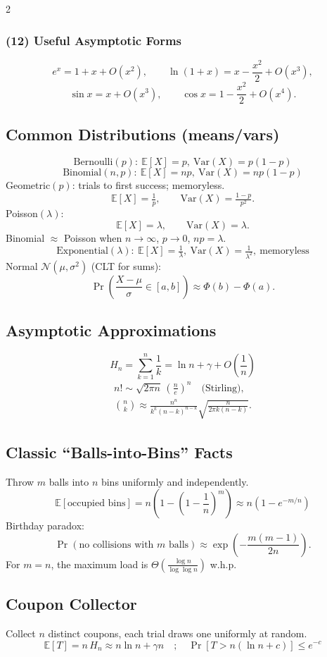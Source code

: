 \documentclass[8pt]{extarticle}
\theoremstyle{definition}
\begin{document}
\begin{multicols*}{2}
\subsubsection*{(12) Useful Asymptotic Forms}
\[
e^x = 1 + x + O(x^2), \qquad
\ln(1+x) = x - \frac{x^2}{2} + O(x^3),
\]
\[
\sin x = x + O(x^3), \qquad
\cos x = 1 - \frac{x^2}{2} + O(x^4).
\]

\subsection{Common Distributions (means/vars)}
\[
\text{Bernoulli}(p):\ \mathbb{E}[X]=p,\ \mathrm{Var}(X)=p(1-p)
\]
\[
\text{Binomial}(n,p):\ \mathbb{E}[X]=np,\ \mathrm{Var}(X)=np(1-p)
\]
Geometric$(p)$: trials to first success; memoryless.
\[
\mathbb{E}[X]=\tfrac{1}{p},\qquad \mathrm{Var}(X)=\tfrac{1-p}{p^2}.
\]
Poisson$(\lambda)$:
\[
\mathbb{E}[X]=\lambda,\qquad \mathrm{Var}(X)=\lambda.
\]
Binomial $\approx$ Poisson when $n\to\infty$, $p\to0$, $np=\lambda$.
\[
\text{Exponential}(\lambda):\ \mathbb{E}[X]=\tfrac{1}{\lambda},\ \mathrm{Var}(X)=\tfrac{1}{\lambda^2},\ \text{memoryless}
\]
Normal $\mathcal{N}(\mu,\sigma^2)$ (CLT for sums):
\[
\Pr\left(\frac{X-\mu}{\sigma}\in[a,b]\right)\approx \Phi(b)-\Phi(a).
\]

\subsection{Asymptotic Approximations}
\[
H_n=\sum_{k=1}^n \frac{1}{k}=\ln n+\gamma+O\!\left(\frac{1}{n}\right)
\]
\[
\begin{gathered}
n!\sim \sqrt{2\pi n}\,\left(\frac{n}{e}\right)^n\quad\text{(Stirling)},\\
\binom{n}{k}\approx \frac{n^n}{k^k(n-k)^{n-k}}\sqrt{\frac{n}{2\pi k(n-k)}}.
\end{gathered}
\]

\subsection{Classic “Balls-into-Bins” Facts}
Throw $m$ balls into $n$ bins uniformly and independently.
\[
\mathbb{E}[\text{occupied bins}] = n\left(1-\left(1-\frac{1}{n}\right)^{\!m}\right)\approx n\left(1-e^{-m/n}\right)
\]
Birthday paradox:
\[
\Pr(\text{no collisions with }m\text{ balls})\approx \exp\!\left(-\frac{m(m-1)}{2n}\right).
\]
For $m=n$, the maximum load is $\Theta\!\left(\frac{\log n}{\log\log n}\right)$ w.h.p.

\subsection{Coupon Collector}
Collect $n$ distinct coupons, each trial draws one uniformly at random.
\[
\mathbb{E}[T]=n\,H_n\approx n\ln n+\gamma n\quad;\quad \Pr\!\left[T>n(\ln n+c)\right]\le e^{-c}
\]


\end{multicols*}
\end{document}
